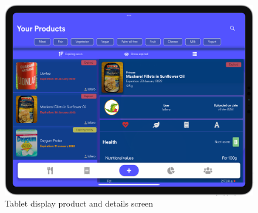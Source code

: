 \vspace*{-0.3cm}
\begin{figure}[H]
  \centering
    \includegraphics[scale=0.22]{./Images//Tablet_mocks/home1.png}
    \vspace*{-0.3cm}
    \caption{Tablet display product and details screen}
\end{figure}